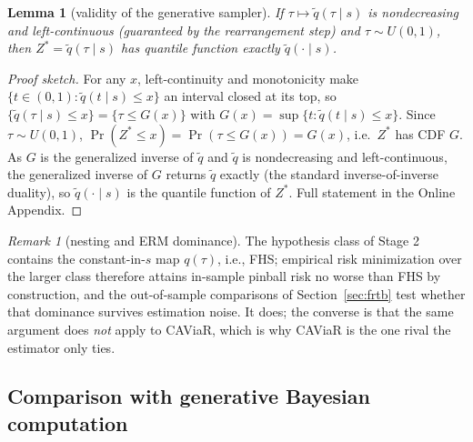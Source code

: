 \documentclass[11pt]{article}
\newtheorem{lemma}{Lemma}
\theoremstyle{remark}
\newtheorem{remark}{Remark}
\begin{document}
\begin{lemma}[validity of the generative sampler]\label{lem:sampler}
If $\tau \mapsto \widetilde{q}(\tau \mid s)$ is nondecreasing and
left-continuous (guaranteed by the rearrangement step) and
$\tau \sim U(0,1)$, then $Z^* = \widetilde{q}(\tau \mid s)$ has
quantile function exactly $\widetilde{q}(\cdot \mid s)$.
\end{lemma}
\begin{proof}[Proof sketch]
For any $x$, left-continuity and monotonicity make
$\{t\in(0,1):\widetilde{q}(t\mid s)\le x\}$ an interval closed at its
top, so $\{\widetilde q(\tau\mid s)\le x\}=\{\tau\le G(x)\}$ with
$G(x)=\sup\{t:\widetilde q(t\mid s)\le x\}$. Since $\tau\sim U(0,1)$,
$\Pr(Z^*\le x)=\Pr(\tau\le G(x))=G(x)$, i.e.\ $Z^*$ has CDF $G$. As $G$
is the generalized inverse of $\widetilde q$ and $\widetilde q$ is
nondecreasing and left-continuous, the generalized inverse of $G$
returns $\widetilde q$ exactly (the standard inverse-of-inverse
duality), so $\widetilde q(\cdot\mid s)$ is the quantile function of
$Z^*$. Full statement in the Online Appendix.
\end{proof}

\begin{remark}[nesting and ERM dominance]\label{rem:nesting}
The hypothesis class of Stage 2 contains the constant-in-$s$ map
$q(\tau)$, i.e., FHS; empirical risk minimization over the larger class
therefore attains in-sample pinball risk no worse than FHS by
construction, and the out-of-sample comparisons of
Section~\ref{sec:frtb} test whether that dominance survives estimation
noise. It does; the converse is that the same argument does
\emph{not} apply to CAViaR, which is why CAViaR is the one rival the
estimator only ties.
\end{remark}

\subsection{Comparison with generative Bayesian computation}\label{sec:polsondelta}
\end{document}
